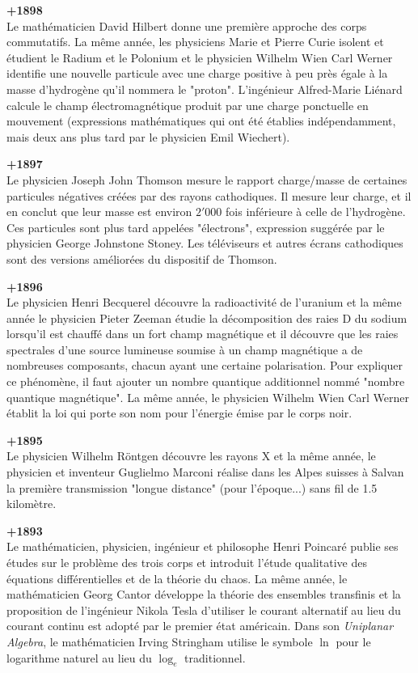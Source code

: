 \textbf{+1898}\\
Le mathématicien David Hilbert donne une première approche des corps commutatifs. La même année, les physiciens Marie et Pierre Curie isolent et étudient le Radium et le Polonium et le physicien Wilhelm Wien Carl Werner identifie une nouvelle particule avec une charge positive à peu près égale à la masse d'hydrogène qu'il nommera le "proton". L'ingénieur Alfred-Marie Liénard calcule le champ électromagnétique produit par une charge ponctuelle en mouvement (expressions mathématiques qui ont été établies indépendamment, mais deux ans plus tard par le physicien Emil Wiechert).

\textbf{+1897}\\
Le physicien Joseph John Thomson mesure le rapport charge/masse de certaines particules négatives créées par des rayons cathodiques. Il mesure leur charge, et il en conclut que leur masse est environ $2'000$ fois inférieure à celle de l'hydrogène. Ces particules sont plus tard appelées "électrons", expression suggérée par le physicien George Johnstone Stoney. Les téléviseurs et autres écrans cathodiques sont des versions améliorées du dispositif de Thomson.

\textbf{+1896}\\
Le physicien Henri Becquerel découvre la radioactivité de l'uranium et la même année le physicien Pieter Zeeman étudie la décomposition des raies D du sodium lorsqu'il est chauffé dans un fort champ magnétique et il découvre que les raies spectrales d'une source lumineuse soumise à un champ magnétique a de nombreuses composants, chacun ayant une certaine polarisation. Pour expliquer ce phénomène, il faut ajouter un nombre quantique additionnel nommé "nombre quantique magnétique". La même année, le physicien Wilhelm Wien Carl Werner établit la loi qui porte son nom pour l'énergie émise par le corps noir.

\textbf{+1895}\\
Le physicien Wilhelm Röntgen découvre les rayons X et la même année, le physicien et inventeur Guglielmo Marconi réalise dans les Alpes suisses à Salvan la première transmission "longue distance" (pour l'époque...) sans fil de 1.5 kilomètre.

\textbf{+1893}\\
Le mathématicien, physicien, ingénieur et philosophe Henri Poincaré publie ses études sur le problème des trois corps et introduit l'étude qualitative des équations différentielles et de la théorie du chaos. La même année, le mathématicien Georg Cantor développe la théorie des ensembles transfinis et la proposition de l'ingénieur Nikola Tesla d'utiliser le courant alternatif au lieu du courant continu est adopté par le premier état américain. Dans son \textit{Uniplanar Algebra}, le mathématicien Irving Stringham utilise le symbole $\ln$ pour le logarithme naturel au lieu du $\log_e$ traditionnel.

